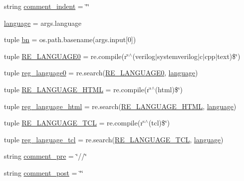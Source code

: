 \begin{DoxyCompactItemize}
\item 
string \hyperlink{namespaceverilog__generator_aba79d1c3e3b9be44f11728cd35c6e73c}{comment\-\_\-indent} = \char`\"{}\char`\"{}
\item 
\hyperlink{namespaceverilog__generator_a5e6335e1f83988a91ae70e4ecb391730}{language} = args.\-language
\item 
tuple \hyperlink{namespaceverilog__generator_a6eb52776ad17e577ce327352763024a8}{bn} = os.\-path.\-basename(args.\-input\mbox{[}0\mbox{]})
\item 
tuple \hyperlink{namespaceverilog__generator_ada96a4c39f1929758761d6a64ad0c760}{R\-E\-\_\-\-L\-A\-N\-G\-U\-A\-G\-E0} = re.\-compile(r\char`\"{}$^\wedge$(verilog$|$systemverilog$|$c$|$cpp$|$text)\$\char`\"{})
\item 
tuple \hyperlink{namespaceverilog__generator_acbf04d1286f0d2641bb2f82f7929d958}{reg\-\_\-language0} = re.\-search(\hyperlink{namespaceverilog__generator_ada96a4c39f1929758761d6a64ad0c760}{R\-E\-\_\-\-L\-A\-N\-G\-U\-A\-G\-E0}, \hyperlink{namespaceverilog__generator_a5e6335e1f83988a91ae70e4ecb391730}{language})
\item 
tuple \hyperlink{namespaceverilog__generator_a9a4484e49b7559533253e1bda0ca0e6c}{R\-E\-\_\-\-L\-A\-N\-G\-U\-A\-G\-E\-\_\-\-H\-T\-M\-L} = re.\-compile(r\char`\"{}$^\wedge$(html)\$\char`\"{})
\item 
tuple \hyperlink{namespaceverilog__generator_ad213e3c3338fcff392ee54c0628944c6}{reg\-\_\-language\-\_\-html} = re.\-search(\hyperlink{namespaceverilog__generator_a9a4484e49b7559533253e1bda0ca0e6c}{R\-E\-\_\-\-L\-A\-N\-G\-U\-A\-G\-E\-\_\-\-H\-T\-M\-L}, \hyperlink{namespaceverilog__generator_a5e6335e1f83988a91ae70e4ecb391730}{language})
\item 
tuple \hyperlink{namespaceverilog__generator_a0ca785f35678184fec88d5d43caa3740}{R\-E\-\_\-\-L\-A\-N\-G\-U\-A\-G\-E\-\_\-\-T\-C\-L} = re.\-compile(r\char`\"{}$^\wedge$(tcl)\$\char`\"{})
\item 
tuple \hyperlink{namespaceverilog__generator_af401d6db8d44ed7c956d2bc940b830b7}{reg\-\_\-language\-\_\-tcl} = re.\-search(\hyperlink{namespaceverilog__generator_a0ca785f35678184fec88d5d43caa3740}{R\-E\-\_\-\-L\-A\-N\-G\-U\-A\-G\-E\-\_\-\-T\-C\-L}, \hyperlink{namespaceverilog__generator_a5e6335e1f83988a91ae70e4ecb391730}{language})
\item 
string \hyperlink{namespaceverilog__generator_ab534858c586df01be1972992248e17e2}{comment\-\_\-pre} = \char`\"{}//\char`\"{}
\item 
string \hyperlink{namespaceverilog__generator_acd9d3d9939ee9a02315fa72596bcb584}{comment\-\_\-post} = \char`\"{}\char`\"{}

\end{DoxyCompactItemize}

